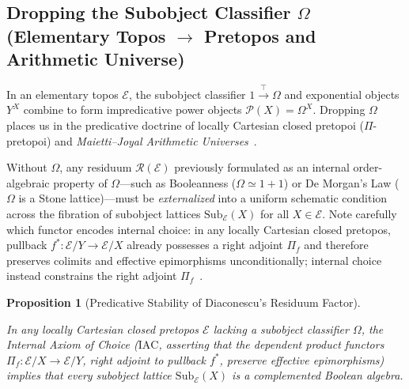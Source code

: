\documentclass[10pt,twoside,openright]{book}
\theoremstyle{crmplain}
\newtheorem{proposition}[theorem]{Proposition}
\theoremstyle{crmdef}
\theoremstyle{crmremark}
\begin{document}
\subsection{\texorpdfstring{Dropping the Subobject Classifier $\Omega$ (Elementary Topos $\to$ Pretopos and Arithmetic Universe)}{Dropping the Subobject Classifier Omega (Elementary Topos -> Pretopos and Arithmetic Universe)}}

In an elementary topos $\mathcal{E}$, the subobject classifier $1 \xrightarrow{\top} \Omega$ and exponential objects $Y^X$ combine to form impredicative power objects $\mathcal{P}(X) = \Omega^X$. Dropping $\Omega$ places us in the predicative doctrine of locally Cartesian closed pretopoi ($\Pi$-pretopoi) and \emph{Maietti--Joyal Arithmetic Universes}~\cite{Maietti05}.

Without $\Omega$, any residuum $\mathcal{R}(\mathcal{E})$ previously formulated as an internal order-algebraic property of $\Omega$---such as Booleanness ($\Omega \simeq 1+1$) or De Morgan's Law ($\Omega$ is a Stone lattice)---must be \emph{externalized} into a uniform schematic condition across the fibration of subobject lattices $\mathrm{Sub}_{\mathcal{E}}(X)$ for all $X \in \mathcal{E}$. Note carefully which functor encodes internal choice: in any locally Cartesian closed pretopos, pullback $f^* : \mathcal{E}/Y \to \mathcal{E}/X$ already possesses a right adjoint $\Pi_f$ and therefore preserves colimits and effective epimorphisms unconditionally; internal choice instead constrains the right adjoint $\Pi_f$~\cite{Diaconescu75,Johnstone02}.

\begin{proposition}[Predicative Stability of Diaconescu's Residuum Factor]\label{prop:predicative-diaconescu}%
%

In any locally Cartesian closed pretopos $\mathcal{E}$ lacking a subobject classifier $\Omega$, the Internal Axiom of Choice ($\mathrm{IAC}$, asserting that the dependent product functors $\Pi_f : \mathcal{E}/X \to \mathcal{E}/Y$, right adjoint to pullback $f^*$, preserve effective epimorphisms) implies that every subobject lattice $\mathrm{Sub}_{\mathcal{E}}(X)$ is a complemented Boolean algebra.

\end{proposition}
\end{document}
